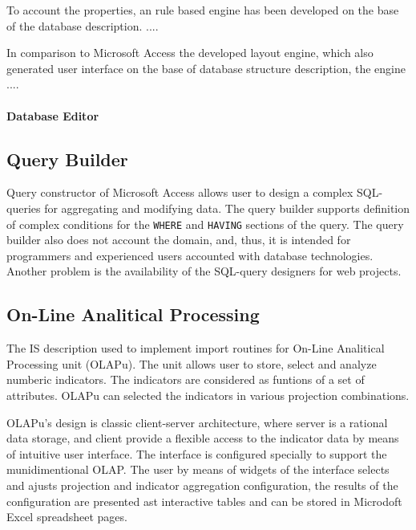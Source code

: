 \documentclass[conference]{IEEEtran}
\begin{document}
To account the properties, an rule based engine has been developed on the base of the database description.  ....


In comparison to Microsoft Access the developed layout engine, which also generated user interface on the base of database structure description, the engine ....

\paragraph{Database Editor}



\subsection{Query Builder}
\label{sec:query-builder}


Query constructor of Microsoft Access allows user to design a complex SQL-queries for aggregating and modifying data.  The query builder supports definition of complex conditions for the \texttt{WHERE} and \texttt{HAVING} sections of the query.  The query builder also does not account the domain, and, thus, it is intended for programmers and experienced users accounted with database technologies.  Another problem is the availability of the SQL-query designers for web projects.



\subsection{On-Line Analitical Processing}
\label{sec:olap}

The IS description used to implement import routines for On-Line Analitical Processing unit (OLAPu).  The unit allows user to store, select and analyze numberic indicators.  The indicators are considered as funtions of a set of attributes.  OLAPu can
selected the indicators in various projection combinations.

OLAPu's design is classic client-server architecture, where server is a rational data storage, and client provide a flexible access to the indicator data by means of intuitive user interface.  The interface is configured specially to support the munidimentional OLAP.  The user by means of widgets of the interface selects and ajusts projection and indicator aggregation configuration, the results of the configuration are presented ast interactive tables and can be stored in Microdoft Excel spreadsheet pages.
\end{document}
